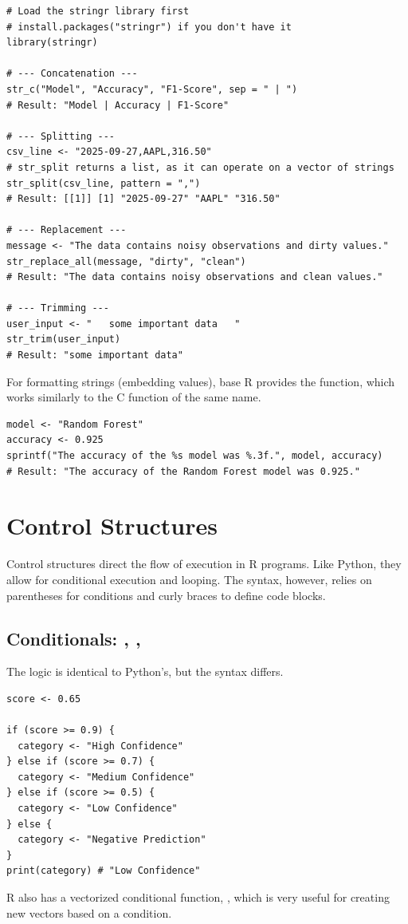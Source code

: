 \begin{example}
\text{ }\begin{verbatim}
# Load the stringr library first
# install.packages("stringr") if you don't have it
library(stringr)

# --- Concatenation ---
str_c("Model", "Accuracy", "F1-Score", sep = " | ")
# Result: "Model | Accuracy | F1-Score"

# --- Splitting ---
csv_line <- "2025-09-27,AAPL,316.50"
# str_split returns a list, as it can operate on a vector of strings
str_split(csv_line, pattern = ",")
# Result: [[1]] [1] "2025-09-27" "AAPL" "316.50"

# --- Replacement ---
message <- "The data contains noisy observations and dirty values."
str_replace_all(message, "dirty", "clean")
# Result: "The data contains noisy observations and clean values."

# --- Trimming ---
user_input <- "   some important data   "
str_trim(user_input)
# Result: "some important data"
\end{verbatim}
\end{example}

For formatting strings (embedding values), base R provides the  function, which works similarly to the C function of the same name.

\begin{verbatim}
model <- "Random Forest"
accuracy <- 0.925
sprintf("The accuracy of the %s model was %.3f.", model, accuracy)
# Result: "The accuracy of the Random Forest model was 0.925."
\end{verbatim}

\section{Control Structures}
\label{sec:r_control_structures}
Control structures direct the flow of execution in R programs. Like Python, they allow for conditional execution and looping. The syntax, however, relies on parentheses for conditions and curly braces \rcode{\{\}} to define code blocks.

\subsection*{Conditionals: , , }
The logic is identical to Python's, but the syntax differs.
\begin{verbatim}
score <- 0.65

if (score >= 0.9) {
  category <- "High Confidence"
} else if (score >= 0.7) {
  category <- "Medium Confidence"
} else if (score >= 0.5) {
  category <- "Low Confidence"
} else {
  category <- "Negative Prediction"
}
print(category) # "Low Confidence"
\end{verbatim}
R also has a vectorized conditional function, , which is very useful for creating new vectors based on a condition.

